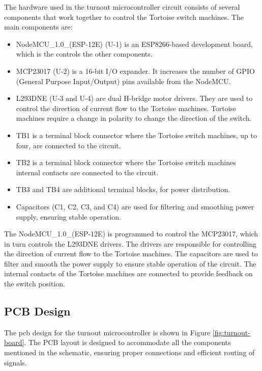 The hardware used in the turnout microcontroller circuit consists of several components that work together to control the Tortoise switch machines. The main components are:
\begin{itemize}
\item NodeMCU\_1.0\_(ESP-12E) (U-1) is an ESP8266-based development board, which is the controls the other components.
\item MCP23017 (U-2) is a 16-bit I/O expander. It increases the number of GPIO (General Purpose Input/Output) pins available from the NodeMCU. 
\item L293DNE (U-3 and U-4) are dual H-bridge motor drivers. They are used to control the direction of current flow to the Tortoise machines. Tortoise machines require a change in polarity to change the direction of the switch. 
\item TB1 is a terminal block connector where the Tortoise switch machines, up to four, are connected to the circuit. 
\item TB2 is a terminal block connector where the Tortoise switch machines internal contacts are connected to the circuit.
\item TB3 and TB4 are additional terminal blocks, for power distribution. 
\item Capacitors (C1, C2, C3, and C4) are used for filtering and smoothing power supply, ensuring stable operation.
\end{itemize}

The NodeMCU\_1.0\_(ESP-12E) is programmed to control the MCP23017, which in turn controls the L293DNE drivers. The drivers are responsible for controlling the direction of current flow to the Tortoise machines. 
The capacitors are used to filter and smooth the power supply to ensure stable operation of the circuit. The internal contacts of the Tortoise machines are connected to provide feedback on the switch position.
\subsection{PCB Design}
The \gls{pcb} design for the turnout microcontroller is shown in Figure \ref{fig:turnout-board}. The PCB layout is designed to accommodate all the components mentioned in the schematic, ensuring proper 
connections and efficient routing of signals.

